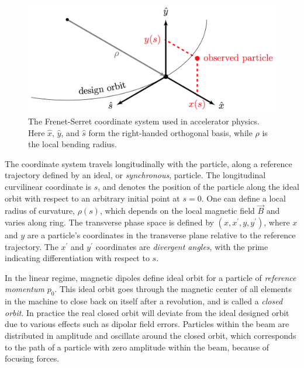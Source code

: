 \begin{figure}[!htb]
    \begin{center}
    \includegraphics[width = 0.8\linewidth]{Figures/Chapter2/Frenet_Serret_Coordinate_System.png}
    \caption{The Frenet-Serret coordinate system used in accelerator physics. Here \(\hat{x}\), \(\hat{y}\), and \(\hat{s}\) form the right-handed orthogonal basis, while \(\rho\) is the local bending radius.}
    \label{figure:frenet_serret_system}
    \end{center}
\end{figure}

The coordinate system travels longitudinally with the particle, along a reference trajectory defined by an ideal, or \emph{synchronous}, particle.
The longitudinal curvilinear coordinate is \(s\), and denotes the position of the particle along the ideal orbit with respect to an arbitrary initial point at \(s = 0\).
One can define a local radius of curvature, \(\rho(s)\), which depends on the local magnetic field \(\vec{B}\) and varies along ring.
The transverse phase space is defined by \((x, x^{\prime}, y, y^{\prime})\), where \(x\) and \(y\) are a particle's coordinates in the transverse plane relative to the reference trajectory.
The \(x^{\prime}\) and \(y^{\prime}\) coordinates are \emph{divergent angles}, with the prime indicating differentiation with respect to \(s\).
\break

In the linear regime, magnetic dipoles define ideal orbit for a particle of \emph{reference momentum} \(p_0\).
This ideal orbit goes through the magnetic center of all elements in the machine to close back on itself after a revolution, and is called a \emph{closed orbit}.
In practice the real closed orbit will deviate from the ideal designed orbit due to various effects such as dipolar field errors.
Particles within the beam are distributed in amplitude and oscillate around the closed orbit, which corresponds to the path of a particle with zero amplitude within the beam, because of focusing forces. 
\break

